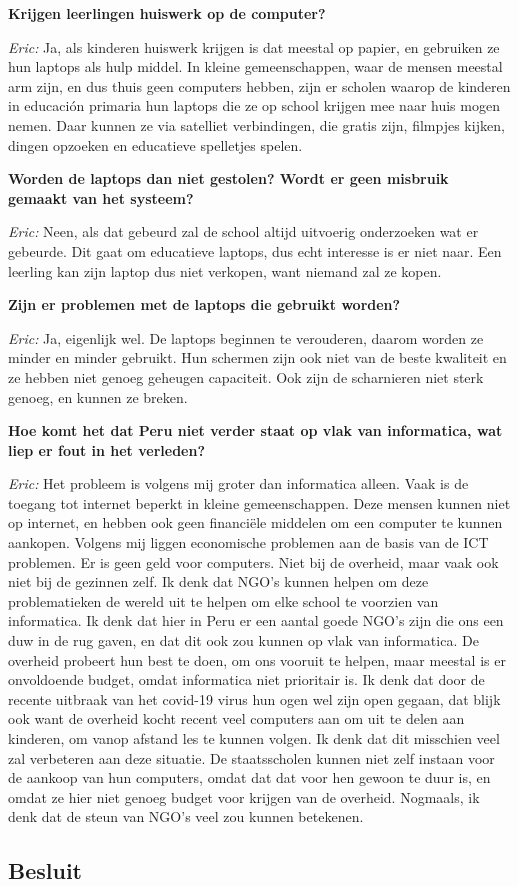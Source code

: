 \textbf{Krijgen leerlingen huiswerk op de computer?}

\textit{Eric:} Ja, als kinderen huiswerk krijgen is dat meestal op papier, en gebruiken ze hun laptops als hulp middel. In kleine gemeenschappen, waar de mensen meestal arm zijn, en dus thuis geen computers hebben, zijn er scholen waarop de kinderen in educación primaria hun laptops die ze op school krijgen mee naar huis mogen nemen. Daar kunnen ze via satelliet verbindingen, die gratis zijn, filmpjes kijken, dingen opzoeken en educatieve spelletjes spelen. 

\textbf{Worden de laptops dan niet gestolen? Wordt er geen misbruik gemaakt van het systeem?}

\textit{Eric:} Neen, als dat gebeurd zal de school altijd uitvoerig onderzoeken wat er gebeurde. Dit gaat om educatieve laptops, dus echt interesse is er niet naar. Een leerling kan zijn laptop dus niet verkopen, want niemand zal ze kopen. 

\textbf{Zijn er problemen met de laptops die gebruikt worden?}

\textit{Eric:} Ja, eigenlijk wel. De laptops beginnen te verouderen, daarom worden ze minder en minder gebruikt. Hun schermen zijn ook niet van de beste kwaliteit en ze hebben niet genoeg geheugen capaciteit. Ook zijn de scharnieren niet sterk genoeg, en kunnen ze breken.

\textbf{Hoe komt het dat Peru niet verder staat op vlak van informatica, wat liep er fout in het verleden?}

\textit{Eric:} Het probleem is volgens mij groter dan informatica alleen. Vaak is de toegang tot internet beperkt in kleine gemeenschappen. Deze mensen kunnen niet op internet, en hebben ook geen financiële middelen om een computer te kunnen aankopen. Volgens mij liggen economische problemen aan de basis van de ICT problemen. Er is geen geld voor computers. Niet bij de overheid, maar vaak ook niet bij de gezinnen zelf. Ik denk dat NGO's kunnen helpen om deze problematieken de wereld uit te helpen om elke school te voorzien van informatica. Ik denk dat hier in Peru er een aantal goede NGO's zijn die ons een duw in de rug gaven, en dat dit ook zou kunnen op vlak van informatica. De overheid probeert hun best te doen, om ons vooruit te helpen, maar meestal is er onvoldoende budget, omdat informatica niet prioritair is. Ik denk dat door de recente uitbraak van het covid-19 virus hun ogen wel zijn open gegaan, dat blijk ook want de overheid kocht recent veel computers aan om uit te delen aan kinderen, om vanop afstand les te kunnen volgen. Ik denk dat dit misschien veel zal verbeteren aan deze situatie. De staatsscholen kunnen niet zelf instaan voor de aankoop van hun computers, omdat dat dat voor hen gewoon te duur is, en omdat ze hier niet genoeg budget voor krijgen van de overheid. Nogmaals, ik denk dat de steun van NGO's veel zou kunnen betekenen.

\subsection{Besluit}

